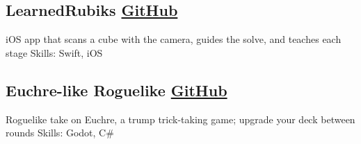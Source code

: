 \subsection{LearnedRubiks \hfill \href{https://github.com/nlarsensmu/LearnedRubiks}{GitHub}}
iOS app that scans a cube with the camera, guides the solve, and teaches each stage
\hfill Skills: Swift, iOS

\vspace*{0.5em}

\subsection{Euchre-like Roguelike \hfill \href{https://github.com/nlarsen31/EuchreGoDot}{GitHub}}
Roguelike take on Euchre, a trump trick-taking game; upgrade your deck between rounds
\hfill Skills: Godot, C\#


%			
%			
%			
%			

